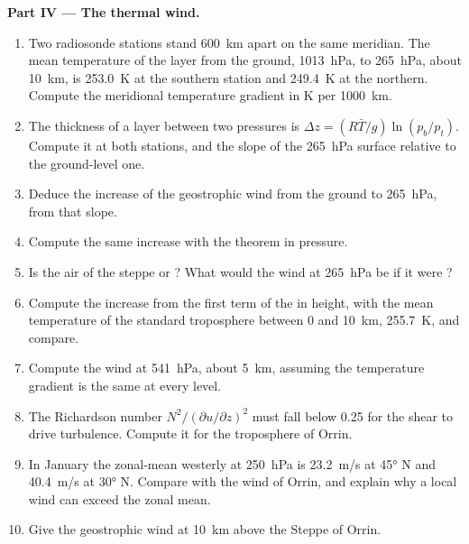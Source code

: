 \begin{problem}
\medskip\noindent\textbf{Part IV --- The thermal wind.}
\begin{enumerate}[resume]
\item Two radiosonde stations stand \qty{600}{km} apart on the same
  meridian. The mean temperature of the layer from the ground,
  \qty{1013}{hPa}, to \qty{265}{hPa}, about \qty{10}{km}, is \qty{253.0}{K}
  at the southern station and \qty{249.4}{K} at the northern. Compute the
  meridional temperature gradient in \unit{K} per \qty{1000}{km}.
\item The thickness of a layer between two pressures is $\Delta z = (R\bar
  T/g)\ln(p_b/p_t)$. Compute it at both stations, and the slope of the
  \qty{265}{hPa} surface relative to the ground-level one.
\item Deduce the increase of the geostrophic wind from the ground to
  \qty{265}{hPa}, from that slope.
\item Compute the same increase with the  theorem in pressure.
\item Is the air of the steppe  or ? What would the wind
  at \qty{265}{hPa} be if it were ?
\item Compute the increase from the first term of the  in
  height, with the mean temperature of the standard troposphere between 0
  and \qty{10}{km}, \qty{255.7}{K}, and compare.
\item Compute the wind at \qty{541}{hPa}, about \qty{5}{km}, assuming the
  temperature gradient is the same at every level.
\item The Richardson number $N^2/(\partial u/\partial z)^2$ must fall below
  0.25 for the shear to drive turbulence. Compute it for the troposphere of
  Orrin.
\item In January the zonal-mean westerly at \qty{250}{hPa} is \qty{23.2}{m/s}
  at \ang{45} N and \qty{40.4}{m/s} at \ang{30} N. Compare with the wind of
  Orrin, and explain why a local wind can exceed the zonal mean.
\item Give the geostrophic wind at \qty{10}{km} above the Steppe of Orrin.
\end{enumerate}
\end{problem}
